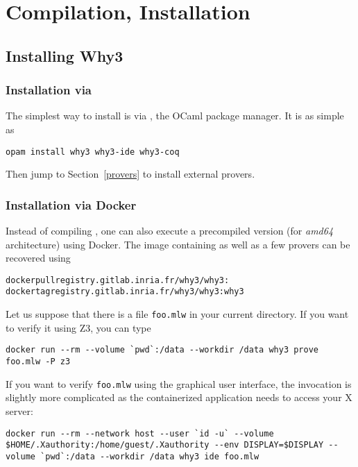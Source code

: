 
\chapter{Compilation, Installation}
\label{sec:install}

\section{Installing Why3}

\subsection{Installation via \opam}

The simplest way to install \why is via \opam, the OCaml
package manager. It is as simple as
\begin{verbatim}
opam install why3 why3-ide why3-coq
\end{verbatim}
Then jump to Section~\ref{provers} to install external provers.

\subsection{Installation via Docker}

Instead of compiling \why, one can also execute a precompiled version
(for \emph{amd64} architecture) using Docker. The image containing \why
as well as a few provers can be recovered using
\begin{alltt}
docker pull registry.gitlab.inria.fr/why3/why3:\whyversion
docker tag registry.gitlab.inria.fr/why3/why3:\whyversion why3
\end{alltt}

Let us suppose that there is a file \texttt{foo.mlw} in your current
directory. If you want to verify it using Z3, you can type
\begin{verbatim}
docker run --rm --volume `pwd`:/data --workdir /data why3 prove foo.mlw -P z3
\end{verbatim}

If you want to verify \texttt{foo.mlw} using the graphical user
interface, the invocation is slightly more complicated as the
containerized application needs to access your X server:
\begin{verbatim}
docker run --rm --network host --user `id -u` --volume $HOME/.Xauthority:/home/guest/.Xauthority --env DISPLAY=$DISPLAY --volume `pwd`:/data --workdir /data why3 ide foo.mlw
\end{verbatim}

